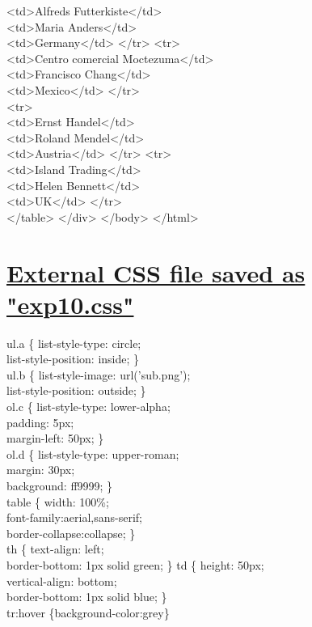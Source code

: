 <td>Alfreds Futterkiste</td>\\
<td>Maria Anders</td>\\
<td>Germany</td> </tr> <tr>\\
<td>Centro comercial Moctezuma</td>\\
<td>Francisco Chang</td>\\
<td>Mexico</td> </tr>\\
<tr>\\
<td>Ernst Handel</td>\\
<td>Roland Mendel</td>\\
<td>Austria</td> </tr> <tr>\\
<td>Island Trading</td>\\
<td>Helen Bennett</td>\\
<td>UK</td> </tr>\\
</table> </div> </body> </html>
\section*{\fontsize{16}{14}\selectfont \underline{External CSS file saved as "exp10.css"}}
ul.a \{ list-style-type: circle;\\
list-style-position: inside; \}\\
ul.b \{ list-style-image: url('sub.png');\\
list-style-position: outside; \}\\
ol.c \{ list-style-type: lower-alpha;\\
padding: 5px;\\
margin-left: 50px; \}\\
ol.d \{ list-style-type: upper-roman;\\
margin: 30px;\\
background: ff9999; \}\\
table \{ width: 100\%;\\
font-family:aerial,sans-serif;\\
border-collapse:collapse; \}\\
th \{ text-align: left;\\
border-bottom: 1px solid green; \}
td \{ height: 50px;\\
vertical-align: bottom;\\
border-bottom: 1px solid blue; \}\\
tr:hover \{background-color:grey\}\\
